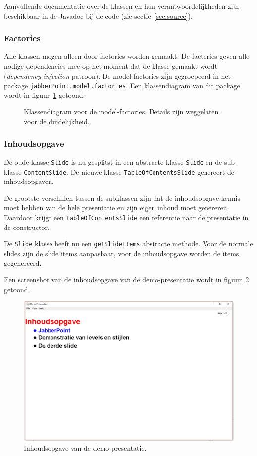 \documentclass[a4paper]{article}
\newcommand{\code}[1]{\lstinline[columns=fixed]{#1}}
\newcommand{\diagram}[3][1.3]{
	\begin{figure}[!htb]
	 \caption{#3}
	 \label{diagram:#2}
	 \makebox[\textwidth][c]{\texttt{[image: Diagrams/\#2.pdf]}}%
	\end{figure}
}
\begin{document}
		Aanvullende documentatie over de klassen en hun verantwoordelijkheden zijn beschikbaar in de Javadoc bij de code (zie sectie~\ref{sec:source}).
		
		\subsubsection{Factories}\label{sec:model-factories}
			Alle klassen mogen alleen door factories worden gemaakt.
			De factories geven alle nodige dependencies mee op het moment dat de klasse gemaakt wordt (\textit{dependency injection} patroon).
			De model factories zijn gegroepeerd in het package \code{jabberPoint.model.factories}.
			Een klassendiagram van dit package wordt in figuur~\ref{diagram:model-factories} getoond.

			\diagram[1.2]{model-factories}{
				Klassendiagram voor de model-factories.
				Details zijn weggelaten voor de duidelijkheid.
			}

		\subsubsection{Inhoudsopgave}
			De oude klasse \code{Slide} is nu gesplitst in een abstracte klasse \code{Slide} en de sub-klasse \code{ContentSlide}.
			De nieuwe klasse \code{TableOfContentsSlide} genereert de inhoudsopgaven.

			De grootste verschillen tussen de subklassen zijn dat de inhoudsopgave kennis moet hebben van de hele presentatie en zijn eigen inhoud moet genereren.
			Daardoor krijgt een \code{TableOfContentsSlide} een referentie naar de presentatie in de constructor.

			De \code{Slide} klasse heeft nu een \code{getSlideItems} abstracte methode.
			Voor de normale slides zijn de slide items aanpasbaar, voor de inhoudsopgave worden de items gegenereerd.

			Een screenshot van de inhoudsopgave van de demo-presentatie wordt in figuur~\ref{fig:master} getoond.
			\begin{figure}[!htb]
			 \caption{
				Inhoudsopgave van de demo-presentatie.\label{fig:master}
			 }
			 \centering \includegraphics[width=\textwidth]{Screenshots/master.png}
			\end{figure}
\end{document}
